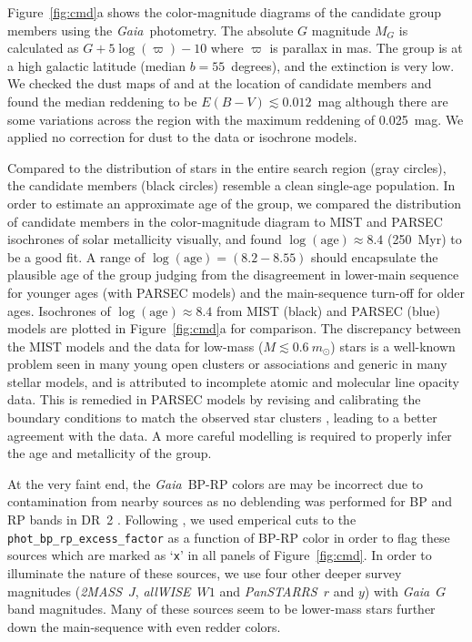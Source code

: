 \documentclass[modern,letterpaper]{aastex61}
\newcommand{\project}[1]{\textsl{#1}}
\newcommand{\acronym}[1]{{\small{#1}}}
\newcommand{\gaia}{\project{Gaia}}
\newcommand{\tmass}{\project{\acronym{2MASS}}}
\newcommand{\allwise}{\project{\acronym{allWISE}}}
\newcommand{\panstarrs}{\project{\acronym{PanSTARRS}}}
\newcommand{\figname}{Figure}
\begin{document}
Figure~\ref{fig:cmd}a shows the color-magnitude diagrams
of the candidate group members using the \gaia\ photometry.
The absolute $G$ magnitude $M_G$ is calculated as $G + 5\log(\varpi) -10$ where
$\varpi$ is parallax in mas.
The group is at a high galactic latitude (median $b=55$~degrees),
and the extinction is very low.
We checked the dust maps of \citet{1998ApJ...500..525S} and
\citet{2017ApJ...846...38L}
at the location of candidate members and found the median reddening to be
$E(B-V)\lesssim 0.012$~mag although there are some variations across the region with
the maximum reddening of 0.025~mag.
We applied no correction for dust to the data or isochrone models.

Compared to the distribution of stars in the entire search region (gray circles),
the candidate members (black circles) resemble a clean single-age population.
In order to estimate an approximate age of the group,
we compared the distribution of candidate members in the color-magnitude diagram
to MIST \citep[][with rotation]{2016ApJ...823..102C} and
PARSEC isochrones \citep[v1.2S;][]{2012MNRAS.427..127B,2015MNRAS.452.1068C}
of solar metallicity visually,
and found $\log(\mathrm{age}) \approx 8.4$ (250~Myr) to be a good fit.
A range of $\log(\mathrm{age}) = (8.2-8.55)$ should encapsulate the plausible
age of the group judging from the disagreement in lower-main sequence for
younger ages (with PARSEC models) and the main-sequence turn-off for older ages.
Isochrones of $\log(\mathrm{age}) \approx 8.4$
from MIST (black) and PARSEC (blue) models are plotted in \figname~\ref{fig:cmd}a
for comparison.
The discrepancy between the MIST models and the data for low-mass
($M\lesssim0.6~m_\odot$) stars is a well-known problem seen in many young open
clusters or associations and generic in many stellar models, and is attributed
to incomplete atomic and molecular line opacity data.
This is remedied in PARSEC models by revising and calibrating the boundary
conditions to match the observed star clusters
\citep{2014MNRAS.444.2525C}, leading to a better agreement with the data.
A more careful modelling is required to properly infer the age and metallicity
of the group.

At the very faint end, the \gaia\ BP-RP colors are may be incorrect due to
contamination from nearby sources as no deblending was performed for BP and RP
bands in DR~2 \citep{2018arXiv180409368E}.
Following \citet{2018arXiv180409378G}, we used emperical cuts to the
\texttt{phot\_bp\_rp\_excess\_factor} as a function of BP-RP color in order to
flag these sources which are marked as `\texttt{x}' in all panels of
Figure~\ref{fig:cmd}.
In order to illuminate the nature of these sources, we use four other deeper
survey magnitudes (\tmass\ $J$, \allwise\ $W1$ and \panstarrs\ $r$ and $y$) with
\gaia\ $G$ band magnitudes.
%
Many of these sources seem to be lower-mass stars further down the main-sequence
with even redder colors.
\end{document}
